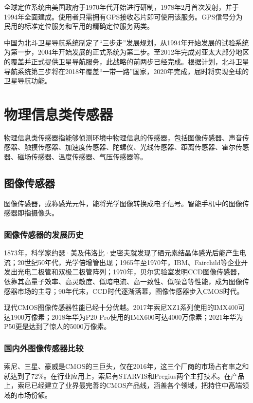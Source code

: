 \documentclass[a4paper,11pt,onecolumn,twoside]{article}
\begin{document}
\begin{multicols}{2}
全球定位系统由美国政府于1970年代开始进行研制，1978年2月首次发射，并于1994年全面建成。使用者只需拥有GPS接收芯片即可使用该服务。GPS信号分为民用的标准定位服务和军用的精确定位服务两类。

中国为北斗卫星导航系统制定了“三步走”发展规划，从1994年开始发展的试验系统为第一步，2004年开始发展的正式系统为第二步。至2012年完成对亚太大部分地区的覆盖并正式提供卫星导航服务，此战略的前两步已经完成。根据计划，北斗卫星导航系统第三步将在2018年覆盖“一带一路”国家，2020年完成，届时将实现全球的卫星导航功能。


\section{物理信息类传感器}

物理信息类传感器指能够侦测环境中物理信息的传感器，包括图像传感器、声音传感器、触摸传感器、加速度传感器、陀螺仪、光线传感器、距离传感器、霍尔传感器、磁场传感器、温度传感器、气压传感器等。

\subsection{图像传感器}

图像传感器，或称感光元件，能将光学图像转换成电子信号。智能手机中的图像传感器即指摄像头。

\subsubsection{图像传感器的发展历史}

1873年，科学家约瑟·美及伟洛比·史密夫就发现了硒元素结晶体感光后能产生电流；20世纪50年代，光学倍增管出现；1965年至1970年，IBM、Fairchild等企业开发出光电二极管和双极二极管阵列；1970年，贝尔实验室发明CCD图像传感器，依靠其高量子效率、高灵敏度、低暗电流、高一致性、低噪音等性能，成为图像传感器市场的主导；90年代末，CCD时代逐渐落幕，图像传感器步入CMOS时代。

现代CMOS图像传感器性能已经十分优越。2017年索尼XZ1系列使用的IMX400可达1900万像素；2018年华为P20 Pro使用的IMX600可达4000万像素；2021年华为P50更是达到了惊人的5000万像素。

\subsubsection{国内外图像传感器比较}

索尼、三星、豪威是CMOS的三巨头，仅在2016年，这三个厂商的市场占有率之和就达到了72\%。在行业应用上，索尼有STARVIS和Pregius两个主打技术。在产品上，索尼已经建立了业界最完善的CMOS产品线，涵盖各个领域，把持住中高端领域的市场份额。


\end{multicols}
\end{document}
